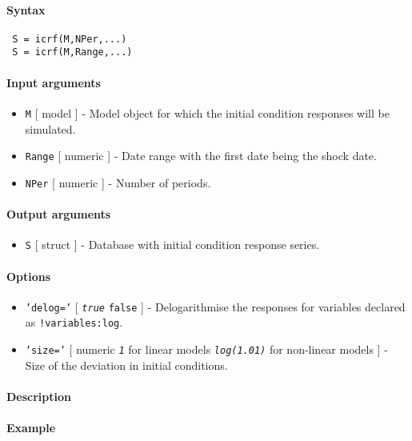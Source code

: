 


	\paragraph{Syntax}
 
 \begin{verbatim}
 S = icrf(M,NPer,...)
 S = icrf(M,Range,...)
 \end{verbatim}
 
 \paragraph{Input arguments}
 
 \begin{itemize}
 \item
   \texttt{M} {[} model {]} - Model object for which the initial
   condition responses will be simulated.
 \item
   \texttt{Range} {[} numeric {]} - Date range with the first date being
   the shock date.
 \item
   \texttt{NPer} {[} numeric {]} - Number of periods.
 \end{itemize}
 
 \paragraph{Output arguments}
 
 \begin{itemize}
 \item
   \texttt{S} {[} struct {]} - Database with initial condition response
   series.
 \end{itemize}
 
 \paragraph{Options}
 
 \begin{itemize}
 \item
   \texttt{'delog='} {[} \emph{\texttt{true}} \textbar{} \texttt{false}
   {]} - Delogarithmise the responses for variables declared as
   \texttt{!variables:log}.
 \item
   \texttt{'size='} {[} numeric \textbar{} \emph{\texttt{1}} for linear
   models \textbar{} \emph{\texttt{log(1.01)}} for non-linear models {]}
   - Size of the deviation in initial conditions.
 \end{itemize}
 
 \paragraph{Description}
 
 \paragraph{Example}



